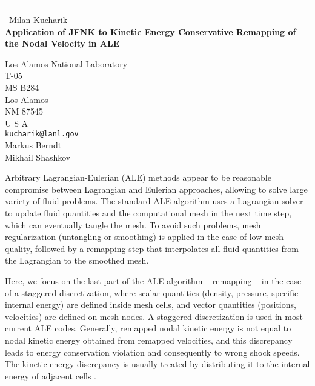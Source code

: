 \documentclass{report}
\begin{document}
\begin{center}
\rule{6in}{1pt} \
{\large Milan Kucharik \\
{\bf Application of JFNK to Kinetic Energy Conservative Remapping of the Nodal Velocity in ALE}}

Los Alamos National Laboratory \\ T-05 \\ MS B284 \\ Los Alamos \\ NM 87545 \\ U S A
\\
{\tt kucharik@lanl.gov}\\
Markus Berndt\\
Mikhail Shashkov\end{center}

Arbitrary Lagrangian-Eulerian (ALE) methods appear to be reasonable
compromise between Lagrangian and Eulerian approaches, allowing to solve
large variety of fluid problems. The standard ALE algorithm uses a
Lagrangian solver to update fluid quantities and the computational mesh
in the next time step, which can eventually tangle the mesh. To avoid
such problems, mesh regularization (untangling or smoothing) is applied
in the case of low mesh quality, followed by a remapping step that
interpolates all fluid quantities from the Lagrangian to the smoothed
mesh.

Here, we focus on the last part of the ALE algorithm -- remapping -- in
the case of a staggered discretization, where scalar quantities (density,
pressure, specific internal energy) are defined inside mesh cells, and
vector quantities (positions, velocities) are defined on mesh nodes. A
staggered discretization is used in most current ALE codes. Generally,
remapped nodal kinetic energy is not equal to nodal kinetic energy
obtained from remapped velocities, and this discrepancy leads to energy
conservation violation and consequently to wrong shock speeds. The
kinetic energy discrepancy is usually treated by distributing it to the
internal energy of adjacent cells \cite{Benson:hydrocodes}.
\end{document}

